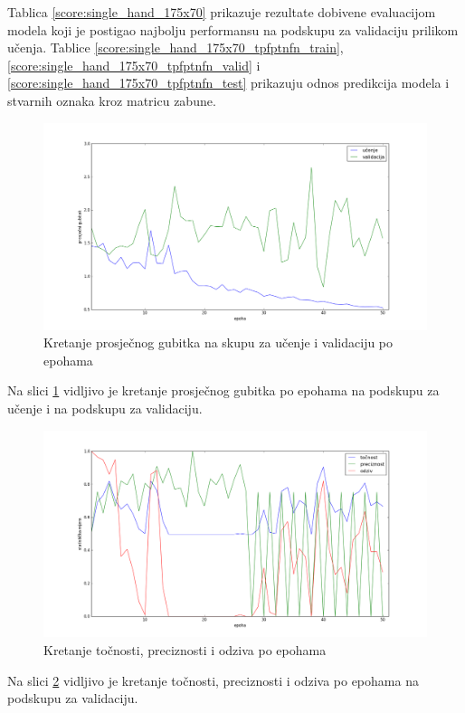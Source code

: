 \documentclass[times, utf8, diplomski, numeric]{fer}
\begin{document}
\noindent Tablica \ref{score:single_hand_175x70} prikazuje rezultate dobivene evaluacijom modela koji je postigao najbolju performansu na podskupu za validaciju prilikom učenja.
Tablice \ref{score:single_hand_175x70_tpfptnfn_train}, \ref{score:single_hand_175x70_tpfptnfn_valid} i \ref{score:single_hand_175x70_tpfptnfn_test} prikazuju odnos predikcija modela i stvarnih oznaka kroz matricu zabune.

\begin{figure}[H]
\centering
\includegraphics[scale=0.35]{images/single_hand_scale025_loss.png}
\caption{Kretanje prosječnog gubitka na skupu za učenje i validaciju po epohama}
\label{img:single_hand_scale025_loss}
\end{figure}
\noindent Na slici \ref{img:single_hand_scale025_loss} vidljivo je kretanje prosječnog gubitka po epohama na podskupu za učenje i na podskupu za validaciju.

\begin{figure}[H]
\centering
\includegraphics[scale=0.35]{images/single_hand_scale025_acc_ap.png}
\caption{Kretanje točnosti, preciznosti i odziva po epohama}
\label{img:single_hand_scale025_acc_ap}
\end{figure}
\noindent Na slici \ref{img:single_hand_scale025_acc_ap} vidljivo je kretanje točnosti, preciznosti i odziva po epohama na podskupu za validaciju.
\end{document}
